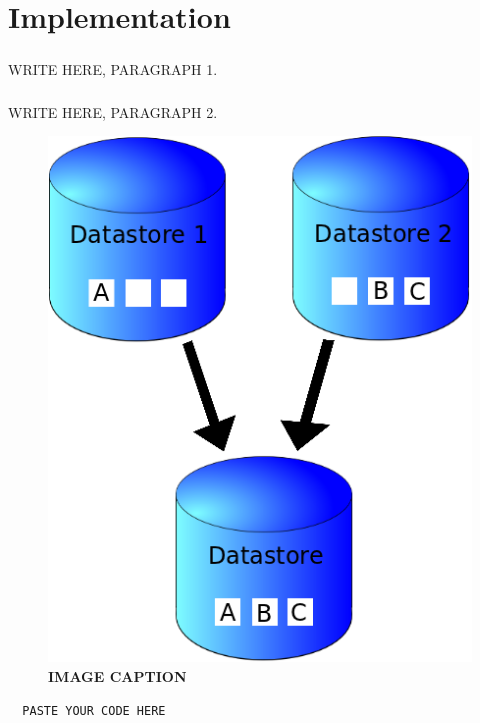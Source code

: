 \chapter{Implementation}
\paragraph{}WRITE HERE, PARAGRAPH 1.
\paragraph{}WRITE HERE, PARAGRAPH 2.

\begin{figure}[H]
  \centering
    \includegraphics[scale=0.5]{project/images/data-sync}
  \caption{\textbf{IMAGE CAPTION}}
\end{figure}

\begin{lstlisting}
  PASTE YOUR CODE HERE
\end{lstlisting}
\newpage

